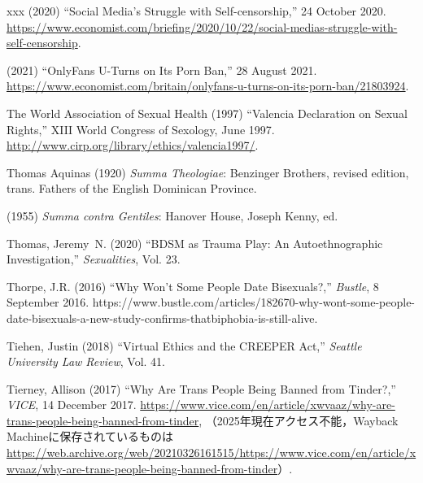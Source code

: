 \documentclass[]{jlreq} \usepackage{mystyle}
\begin{document}
\begin{thebibliography}{xxx}
 \bysame{}  (2020) ``Social Media's Struggle with Self-censorship,'' 24 October
  2020.
  \url{https://www.economist.com/briefing/2020/10/22/social-medias-struggle-with-self-censorship}.

 \bysame{}  (2021) ``OnlyFans U-Turns on Its Porn Ban,'' 28 August 2021.
  \url{https://www.economist.com/britain/onlyfans-u-turns-on-its-porn-ban/21803924}.

{The World Association of Sexual Health} (1997) ``Valencia Declaration on
  Sexual Rights,'' XIII World Congress of Sexology, June 1997.
  \url{http://www.cirp.org/library/ethics/valencia1997/}.

{Thomas Aquinas} (1920)  \textit{ Summa Theologiae}: Benzinger Brothers,
  revised edition, trans. Fathers of the English Dominican Province.

 \bysame{}  (1955)  \textit{ Summa contra Gentiles}: Hanover House, Joseph
  Kenny, ed.

Thomas, Jeremy~N. (2020) ``BDSM as Trauma Play: An Autoethnographic
  Investigation,'' \textit{ Sexualities}, Vol. 23.

Thorpe, J.R. (2016) ``Why Won't Some People Date Bisexuals?,'' \emph{Bustle}, 8
  September 2016.
  https://www.bustle.com/articles/182670-why-wont-some-people-date-bisexuals-a-new-study-confirms-thatbiphobia-is-still-alive.

Tiehen, Justin (2018) ``Virtual Ethics and the CREEPER Act,'' \textit{ Seattle
  University Law Review}, Vol. 41.

Tierney, Allison (2017) ``Why Are Trans People Being Banned from Tinder?,''
  \emph{VICE}, 14 December 2017.
  \url{https://www.vice.com/en/article/xwvaaz/why-are-trans-people-being-banned-from-tinder},
  （2025年現在アクセス不能，Wayback
  Machineに保存されているものは\url{https://web.archive.org/web/20210326161515/https://www.vice.com/en/article/xwvaaz/why-are-trans-people-being-banned-from-tinder}）.


\end{thebibliography}
\end{document}
